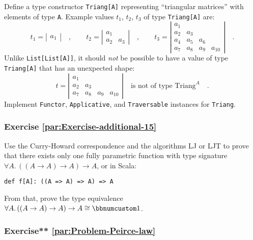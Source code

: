 Define a type constructor \lstinline!Triang[A]! representing \textsf{``}triangular
matrices\textsf{''} with elements of type \lstinline!A!. Example values $t_{1}$,
$t_{2}$, $t_{3}$ of type \lstinline!Triang[A]! are:
\[
t_{1}=\left|\begin{array}{c}
a_{1}\end{array}\right|\quad,\quad\quad t_{2}=\left|\begin{array}{cc}
a_{1}\\
a_{2} & a_{3}
\end{array}\right|\quad,\quad\quad t_{3}=\left|\begin{array}{cccc}
a_{1}\\
a_{2} & a_{3}\\
a_{4} & a_{5} & a_{6}\\
a_{7} & a_{8} & a_{9} & a_{10}
\end{array}\right|\quad.
\]
Unlike \lstinline!List[List[A]]!, it should \emph{not} be possible
to have a value of type \lstinline!Triang[A]! that has an unexpected
shape:
\[
t=\left|\begin{array}{cccc}
a_{1}\\
a_{2} & a_{3}\\
a_{7} & a_{8} & a_{9} & a_{10}
\end{array}\right|\quad\text{is not of type }\text{Triang}^{A}\quad.
\]
 Implement \lstinline!Functor!, \lstinline!Applicative!, and \lstinline!Traversable!
instances for \lstinline!Triang!.

\subsubsection{Exercise \label{par:Exercise-additional-15}\ref{par:Exercise-additional-15}}

Use the Curry-Howard correspondence
and the algorithms LJ or LJT to prove that there
exists only one fully parametric function with type signature $\forall A.\,((A\rightarrow A)\rightarrow A)\rightarrow A$,
or in Scala:
\begin{lstlisting}
def f[A]: ((A => A) => A) => A
\end{lstlisting}
From that, prove the type equivalence $\forall A.\,((A\rightarrow A)\rightarrow A)\rightarrow A\cong\bbnum 1$.

\subsubsection{Exercise{*}{*} \label{par:Problem-Peirce-law}\ref{par:Problem-Peirce-law}}

